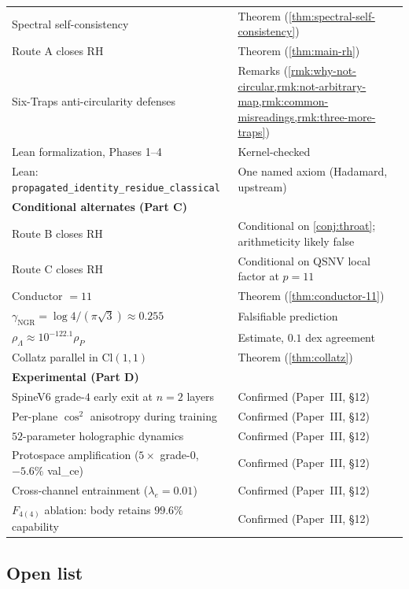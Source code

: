 \documentclass[11pt,a4paper]{article}
\theoremstyle{plain}
\theoremstyle{definition}
\theoremstyle{remark}
\numberwithin{equation}{section}
\providecommand{\Cl}{\mathrm{Cl}}
\begin{document}
\begin{table}[ht]
\begin{tabular}{p{8.5cm} p{5cm}}
Spectral self-consistency & Theorem (\cref{thm:spectral-self-consistency}) \\
Route A closes RH & Theorem (\cref{thm:main-rh}) \\
Six-Traps anti-circularity defenses & Remarks (\cref{rmk:why-not-circular,rmk:not-arbitrary-map,rmk:common-misreadings,rmk:three-more-traps}) \\
Lean formalization, Phases 1--4 & Kernel-checked \\
Lean: \texttt{propagated\_identity\_residue\_classical} & One named axiom (Hadamard, upstream) \\
\midrule
\multicolumn{2}{l}{\textbf{Conditional alternates (Part C)}} \\
Route B closes RH & Conditional on \cref{conj:throat}; arithmeticity likely false \\
Route C closes RH & Conditional on QSNV local factor at $p = 11$ \\
Conductor $= 11$ & Theorem (\cref{thm:conductor-11}) \\
$\gamma_{\text{NGR}} = \log 4/(\pi\sqrt{3}) \approx 0.255$ & Falsifiable prediction \\
$\rho_\Lambda \approx 10^{-122.1}\rho_P$ & Estimate, $0.1$ dex agreement \\
Collatz parallel in $\Cl(1,1)$ & Theorem (\cref{thm:collatz}) \\
\midrule
\multicolumn{2}{l}{\textbf{Experimental (Part D)}} \\
SpineV6 grade-$4$ early exit at $n=2$ layers & Confirmed (Paper~III, \S 12) \\
Per-plane $\cos^2$ anisotropy during training & Confirmed (Paper~III, \S 12) \\
$52$-parameter holographic dynamics & Confirmed (Paper~III, \S 12) \\
Protospace amplification ($5\times$ grade-$0$, $-5.6\%$ val\_ce) & Confirmed (Paper~III, \S 12) \\
Cross-channel entrainment ($\lambda_e = 0.01$) & Confirmed (Paper~III, \S 12) \\
$F_{4(4)}$ ablation: body retains $99.6\%$ capability & Confirmed (Paper~III, \S 12) \\
\bottomrule
\end{tabular}
\end{table}

\subsection{Open list}
\end{document}
